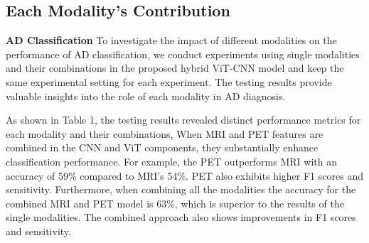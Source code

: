 
\subsection{Each Modality’s Contribution}
\textbf{AD Classification}
To investigate the impact of different modalities on the performance of AD classification, we conduct experiments using single modalities and their combinations in the proposed hybrid ViT-CNN model and keep the same experimental setting for each experiment. The testing results provide valuable insights into the role of each modality in AD diagnosis. 

As shown in Table 1, the testing results revealed distinct performance metrics for each modality and their combinations, When MRI and PET features are combined in the CNN and ViT components, they substantially enhance classification performance. For example, the PET outperforms MRI with an accuracy of 59\% compared to MRI’s 54\%. PET also exhibits higher F1 scores and sensitivity. Furthermore, when combining all the modalities the accuracy for the combined MRI and PET model is 63\%, which is superior to the results of the single modalities. The combined approach also shows improvements in F1 scores and sensitivity. 


